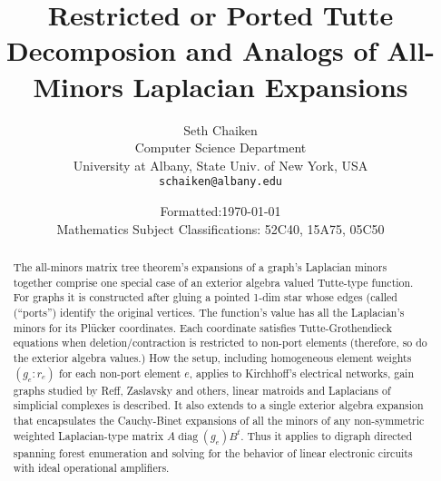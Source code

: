 \documentclass[12pt]{article}
\title{Restricted or Ported Tutte Decomposion and Analogs
  of All-Minors Laplacian Expansions}
\author{Seth Chaiken\\
\small Computer Science Department\\[-0.8ex]
\small University at Albany, State Univ. of New York, USA\\[-0.8ex]
\small \texttt{schaiken@albany.edu}
}
\date{
Formatted:\today\\
\small Mathematics Subject Classifications: 52C40, 15A75, 05C50}
\begin{document}
\maketitle

\begin{abstract}
  The all-minors matrix tree theorem's expansions of a graph's
  Laplacian minors together comprise one special case of an exterior
  algebra valued Tutte-type function.  For graphs it is constructed
  after gluing a pointed 1-dim star whose edges (called (``ports'')
  identify the original vertices.  The function's value has all the
  Laplacian's minors for its Pl{\"u}cker coordinates.  Each coordinate
  satisfies Tutte-Grothendieck equations when deletion/contraction is
  restricted to non-port elements (therefore, so do the exterior
  algebra values.)  How the setup, including homogeneous element
  weights $(g_e:r_e)$ for each non-port element $e$, applies to
  Kirchhoff's electrical networks, gain graphs studied by Reff,
  Zaslavsky and others, linear matroids and Laplacians of simplicial
  complexes is described.  It also extends to a single exterior
  algebra expansion that encapsulates the Cauchy-Binet expansions of
  all the minors of any non-symmetric weighted Laplacian-type matrix
  $A\operatorname{diag}(g_e)B^{t}$.  Thus it applies to digraph
  directed spanning forest enumeration and solving for the behavior of
  linear electronic circuits with ideal operational amplifiers.
\end{abstract}
\end{document}
